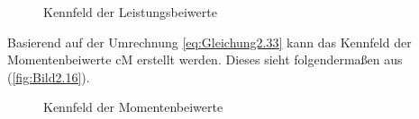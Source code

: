 \begin{figure}[H]
   \centering
   \caption[Kennfeld der Leistungsbeiwerte]{Kennfeld der Leistungsbeiwerte}
   \label{fig:Bild2.15}
\end{figure}

Basierend auf der Umrechnung \autoref{eq:Gleichung2.33} kann das Kennfeld der Momentenbeiwerte \acs{cM} erstellt werden. Dieses sieht folgendermaßen aus (\autoref{fig:Bild2.16}).
\begin{figure}[H]
   \centering
   \caption[Kennfeld der Momentenbeiwerte]{Kennfeld der Momentenbeiwerte}
   \label{fig:Bild2.16}
\end{figure}

